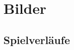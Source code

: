 \chapter{Bilder}
\label{anhang:chapter-bilder}

\section{Spielverläufe}
\label{anhang:section-spielverlaeufe}

\vspace*{-0.25cm}

